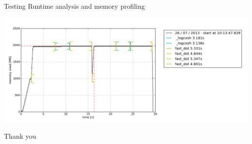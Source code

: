 \documentclass{beamer}
\begin{document}
\begin{frame}{Testing}
    Runtime analysis and memory profiling

    \includegraphics[width=\textwidth]{memory-profiler}
\end{frame}

\begin{frame}[standout]
    Thank you
\end{frame}
\end{document}
